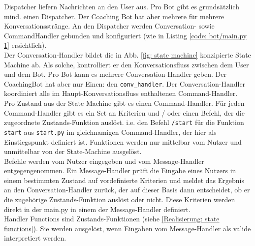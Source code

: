         Dispatcher liefern Nachrichten an den User aus. Pro Bot gibt es grundsätzlich mind. einen Dispatcher. Der Coaching Bot hat aber mehrere für mehrere Konversationsstränge. An den Dispatcher werden Conversation- sowie CommandHandler gebunden und konfiguriert (wie in Listing \ref*{code: bot/main.py 1} ersichtlich).\\
        Der Conversation-Handler bildet die in Abb. \ref*{fig: state machine} konzipierte State Machine ab. Als solche, kontrolliert er den Konversationsfluss zwischen dem User und dem Bot. Pro Bot kann es mehrere Conversation-Handler geben. Der CoachingBot hat aber nur Einen: den \verb|conv_handler|. Der Conversation-Handler koordiniert alle im Haupt-Konversationsfluss enthaltenen Command-Handler.\\
        Pro Zustand aus der State Machine gibt es einen Command-Handler. Für jeden Command-Handler gibt es ein Set an Kriterien und / oder einen Befehl, der die zugeordnete Zustands-Funktion auslöst. i.e. den Befehl \verb|/start| für die Funktion \verb|start| aus \verb|start.py| im gleichnamigen Command-Handler, der hier als Einstiegspunkt definiert ist. Funktionen werden nur mittelbar vom Nutzer und unmittelbar von der State-Machine ausgelöst.\\
        Befehle werden vom Nutzer eingegeben und vom Message-Handler entgegengenommen. Ein Message-Handler prüft die Eingabe eines Nutzers in einem bestimmten Zustand auf vordefinierte Kriterien und meldet das Ergebnis an den Conversation-Handler zurück, der auf dieser Basis dann entscheidet, ob er die zugehörige Zustands-Funktion auslöst oder nicht. Diese Kriterien werden direkt in der main.py in einem der Message-Handler definiert. \\
        Handler Functions sind Zustands-Funktionen (siehe \ref*{Realisierung: state functions}). Sie werden ausgelöst, wenn Eingaben vom Message-Handler als valide interpretiert werden. 

